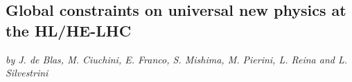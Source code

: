 

\newcommand{\HEPfit}{{\tt HEPfit}}


\subsection{Global constraints on universal new physics at the HL/HE-LHC}
\label{sec8:universalewpo}

\begin{center}
	\textit{by J. de Blas, M. Ciuchini, E. Franco, S. Mishima, M. Pierini, L. Reina and L. Silvestrini}
\end{center}


\label{sec:general-framework}

